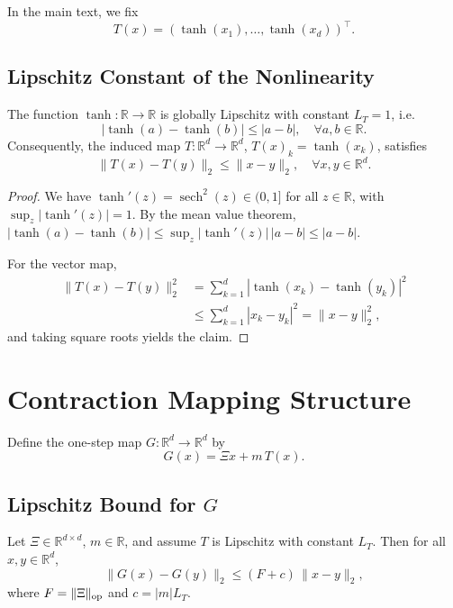 \documentclass[11pt,letterpaper]{article}
\begin{document}
In the main text, we fix
\[
  T(x) = (\tanh(x_1),\dots,\tanh(x_d))^\top.
\]

\subsection{Lipschitz Constant of the Nonlinearity}

\begin{lemma}
The function \(\tanh : \mathbb{R} \to \mathbb{R}\) is globally Lipschitz
with constant \(L_T = 1\), i.e.
\[
  |\tanh(a) - \tanh(b)| \le |a-b|, \quad \forall a,b \in \mathbb{R}.
\]
Consequently, the induced map
\(T : \mathbb{R}^d \to \mathbb{R}^d\),
\(T(x)_k = \tanh(x_k)\), satisfies
\[
  \|T(x) - T(y)\|_2 \le \|x-y\|_2, \quad \forall x,y\in\mathbb{R}^d.
\]
\end{lemma}

\begin{proof}
We have \(\tanh'(z) = \operatorname{sech}^2(z) \in (0,1]\) for all
\(z\in\mathbb{R}\), with \(\sup_z |\tanh'(z)| = 1\).
By the mean value theorem,
\(|\tanh(a)-\tanh(b)| \le \sup_z |\tanh'(z)|\,|a-b| \le |a-b|\).

For the vector map,
\begin{align*}
  \|T(x) - T(y)\|_2^2
  &= \sum_{k=1}^d |\tanh(x_k) - \tanh(y_k)|^2 \\
  &\le \sum_{k=1}^d |x_k - y_k|^2
   = \|x-y\|_2^2,
\end{align*}
and taking square roots yields the claim.
\end{proof}

\section{Contraction Mapping Structure}

Define the one-step map \(G : \mathbb{R}^d \to \mathbb{R}^d\) by
\begin{equation}
  G(x) = \Xi x + m\, T(x).
\end{equation}

\subsection{Lipschitz Bound for \(G\)}

\begin{lemma}
\label{lem:G-Lipschitz}
Let \(\Xi \in \mathbb{R}^{d\times d}\), \(m\in\mathbb{R}\), and assume
\(T\) is Lipschitz with constant \(L_T\). Then for all \(x,y\in\mathbb{R}^d\),
\begin{equation}
  \|G(x) - G(y)\|_2
  \le (F + c)\,\|x-y\|_2,
\end{equation}
where \(F = \|\Xi\|_{\rm op}\) and \(c = |m|L_T\).
\end{lemma}
\end{document}
